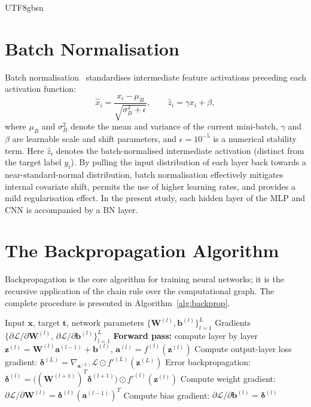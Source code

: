 \documentclass[a4paper,12pt]{report}
\begin{document}
\begin{CJK}{UTF8}{gbsn}
\section{Batch Normalisation}
\label{sec:batchnorm}

Batch normalisation~\cite{ioffe2015} standardises intermediate feature activations
preceding each activation function:
\begin{equation}
  \hat{x}_i = \frac{x_i - \mu_B}{\sqrt{\sigma_B^2 + \epsilon}}, \qquad
  \hat{z}_i = \gamma \hat{x}_i + \beta,
  \label{eq:batchnorm}
\end{equation}
where $\mu_B$ and $\sigma_B^2$ denote the mean and variance of the current mini-batch,
$\gamma$ and $\beta$ are learnable scale and shift parameters, and
$\epsilon = 10^{-5}$ is a numerical stability term. Here $\hat{z}_i$ denotes the
batch-normalised intermediate activation (distinct from the target label $y_i$). By
pulling the input distribution of
each layer back towards a near-standard-normal distribution, batch normalisation
effectively mitigates internal covariate shift, permits the use of higher learning rates,
and provides a mild regularisation effect. In the present study, each hidden layer of the
MLP and CNN is accompanied by a BN layer.

\section{The Backpropagation Algorithm}
\label{sec:backprop}

Backpropagation is the core algorithm for training neural networks; it is the recursive
application of the chain rule over the computational graph. The complete procedure is
presented in Algorithm~\ref{alg:backprop}.

\begin{algorithm}[H]
  \caption{Backpropagation algorithm (single-sample version)}
  \label{alg:backprop}
  \begin{algorithmic}[1]
    \REQUIRE Input $\mathbf{x}$, target $\mathbf{t}$, network parameters
      $\{\mathbf{W}^{(l)},\mathbf{b}^{(l)}\}_{l=1}^{L}$
    \ENSURE Gradients $\{\partial\mathcal{L}/\partial\mathbf{W}^{(l)},\,
      \partial\mathcal{L}/\partial\mathbf{b}^{(l)}\}_{l=1}^{L}$
    \STATE \textbf{Forward pass:} compute layer by layer
      $\mathbf{z}^{(l)} = \mathbf{W}^{(l)}\mathbf{a}^{(l-1)} + \mathbf{b}^{(l)}$,
      $\mathbf{a}^{(l)} = f^{(l)}(\mathbf{z}^{(l)})$
    \STATE Compute output-layer loss gradient:
      $\boldsymbol{\delta}^{(L)} = \nabla_{\mathbf{a}^{(L)}}\mathcal{L} \odot
      f'^{(L)}(\mathbf{z}^{(L)})$
      \STATE Error backpropagation:
        $\boldsymbol{\delta}^{(l)} = \bigl((\mathbf{W}^{(l+1)})^T \boldsymbol{\delta}^{(l+1)}\bigr)
        \odot f'^{(l)}(\mathbf{z}^{(l)})$
    \ENDFOR
      \STATE Compute weight gradient:
        $\partial\mathcal{L}/\partial\mathbf{W}^{(l)} =
        \boldsymbol{\delta}^{(l)}(\mathbf{a}^{(l-1)})^T$
      \STATE Compute bias gradient:
        $\partial\mathcal{L}/\partial\mathbf{b}^{(l)} = \boldsymbol{\delta}^{(l)}$
    \ENDFOR
  \end{algorithmic}
\end{algorithm}


\end{CJK}
\end{document}
